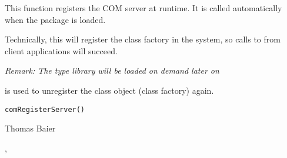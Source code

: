 \begin{Description}\relax
This function registers the COM server at runtime. It is called automatically
when the package  is loaded.

Technically, this will register the class factory in the system, so calls
to  from client applications will succeed.

\emph{Remark: The type library will be loaded on demand later on}

 is used to unregister the class object (class
factory) again.
\end{Description}
\begin{Usage}
\begin{verbatim}
comRegisterServer()
\end{verbatim}
\end{Usage}
\begin{Arguments}
\end{Arguments}
\begin{Author}\relax
Thomas Baier
\end{Author}
\begin{SeeAlso}\relax
{},
\end{SeeAlso}

